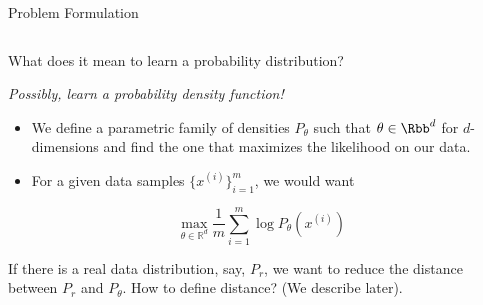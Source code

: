 \documentclass[aspectratio=169,xcolor=dvipsnames,svgnames,x11names,fleqn]{beamer}
\begin{document}
\begin{frame}[fragile]{Problem Formulation}

\footnotesize

    \begin{columns}[T]
        \begin{column}{0.6\textwidth}
            \begin{tcolorbox}[
                enhanced,
                colback=blue!5, 
                colframe=blue!75!black, 
                title=Learning a Distribution,
                fonttitle=\bfseries,
                arc=4pt
            ]
            What does it mean to learn a probability distribution? 

            \vspace{0.2cm}
            
            \textit{Possibly, learn a probability density function!}
            \end{tcolorbox}

            \begin{itemize}
                \item We define a parametric family of densities $P_\theta$ such that $\theta \in \Rbb^d$ for $d$-dimensions and find the one that maximizes the likelihood on our data.
                
                \item For a given data samples $\{ x^{(i)} \}_{i=1}^m$, we would want
                
                 \begin{equation*}
                \max_{\theta \in \mathbb{R}^d} \frac{1}{m} \sum_{i=1}^m \log P_\theta (x^{(i)})
            \end{equation*}

                
            \end{itemize}

           
           
If there is a real data distribution, say, $P_r$, we want to reduce the distance between $P_r$ and $P_\theta$. How to define distance? (We describe later).

        \end{column}

        \begin{column}{0.4\textwidth}
            \begin{center}
\end{center}
\end{column}
\end{columns}
\end{frame}
\end{document}
